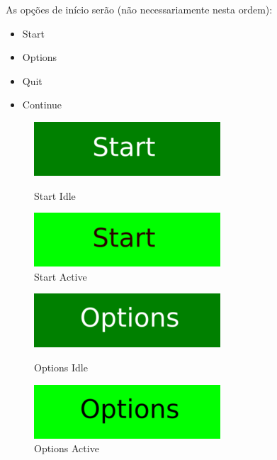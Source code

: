 \documentclass[12pt]{article}
\begin{document}
As opções de início serão (não necessariamente nesta ordem):

\begin{itemize}
    \item Start
    \item Options
    \item Quit
    \item Continue
\end{itemize}


\begin{figure}[!htb]
	\centering
	\begin{minipage}{0.5\textwidth}
		\centering
		\includegraphics[scale=1]{menu_buttom/start_idle.png}
		\caption{Start Idle}
		\label{start_idle}
	\end{minipage}%
	\begin{minipage}{0.5\textwidth}
		\centering
		\includegraphics[scale=1]{menu_buttom/start_active.png}
		\caption{Start Active}
		\label{start_active}
	\end{minipage}
\end{figure}

\begin{figure}[!htb]
	\centering
	\begin{minipage}{0.5\textwidth}
		\centering
		\includegraphics[scale=1]{menu_buttom/options_idle.png}
		\caption{Options Idle}
		\label{options_idle}
	\end{minipage}%
	\begin{minipage}{0.5\textwidth}
		\centering
		\includegraphics[scale=1]{menu_buttom/options_active.png}
		\caption{Options Active}
		\label{options_active}
	\end{minipage}
\end{figure}
\end{document}
